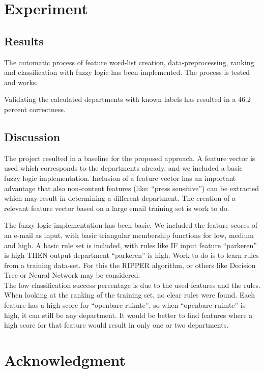 \documentclass[journal]{IEEEtran}
\begin{document}
\section{Experiment}

\subsection{Results}

The automatic process of feature word-list creation, data-preprocessing, ranking and classification with fuzzy logic has been implemented. The process is tested and works.

Validating the calculated departments with known labels has resulted in a 46.2 percent correctness.

\subsection{Discussion}

The project resulted in a baseline for the proposed approach. A feature vector is used which corresponds to the departments already, and we included a basic fuzzy logic implementation. Inclusion of a feature vector has an important advantage that also non-content features (like: ``press sensitive'') can be extracted which may result in determining a different department. The creation of a relevant feature vector based on a large email training set is work to do. 

The fuzzy logic implementation has been basic. We included the feature scores of an e-mail as input, with basic triangular membership functions for low, medium and high. A basic rule set is included, with rules like IF input feature ``parkeren'' is high THEN output department ``parkeren'' is high. Work to do is to learn rules from a training data-set. For this the RIPPER algorithm, or others like Decision Tree or Neural Network may be considered. \cite{rulelearning}\cite{ripper}\\
 
The low classification success percentage is due to the used features and the rules. When looking at the ranking of the training set, no clear rules were found. Each feature has a high score for ``openbare ruimte'', so when ``openbare ruimte'' is high, it can still be any department. It would be better to find features where a high score for that feature would result in only one or two departments. 

\section{Acknowledgment}
\end{document}
